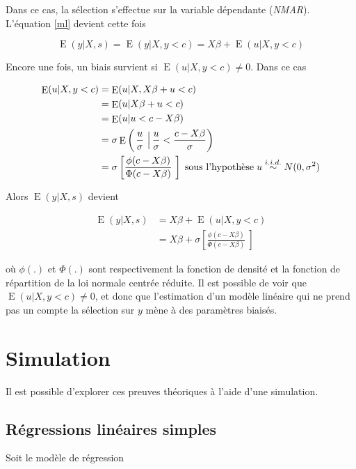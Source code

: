 \documentclass{article}
\DeclareMathOperator{\esp}{E}
\begin{document}
Dans ce cas, la s\'{e}lection s'effectue sur la variable d\'{e}pendante (\textit{NMAR}). L'\'{e}quation \eqref{ml} devient cette fois

\[\esp(y|X,s)=\esp(y|X,y<c)=X\beta+\esp(u|X,y<c)\]

Encore une fois, un biais survient si $\esp(u|X,y<c)\neq0$. Dans ce cas

\begin{align}
\esp(u|X,y<c) & = \esp(u|X,X\beta+u<c) \nonumber \\
 & = \esp(u|X\beta+u<c) \nonumber \\
 & = \esp(u|u<c-X\beta) \nonumber \\
 & = \sigma\esp\left(\left. \frac{u}{\sigma}\  \right\rvert \frac{u}{\sigma}< \frac{c-X\beta}{\sigma} \right)  \nonumber \\
  & = \sigma\left[ \frac{\phi(c-X\beta)}{\Phi(c-X\beta)}\ \right] \hspace{0.1cm}  \text{sous l'hypoth\`{e}se} \hspace{0.1cm} u\overset{i.i.d.}{\sim} N(0,\sigma^2) \nonumber
\end{align}

Alors $\esp(y|X,s)$ devient

\begin{align}
\esp(y|X,s) & =X\beta+\esp(u|X,y<c) \nonumber \\
& = X\beta+\sigma\left[ \frac{\phi(c-X\beta)}{\Phi(c-X\beta)}\ \right] \nonumber
\end{align}

o\`{u} $\phi(.)$ et $\Phi(.)$ sont respectivement la fonction de densit\'{e} et la fonction de r\'{e}partition de la loi normale centr\'{e}e r\'{e}duite. Il est possible de voir que $\esp(u|X,y<c)\neq0$, et donc que l'estimation d'un mod\`{e}le lin\'{e}aire qui ne prend pas un compte la s\'{e}lection sur $y$ m\`{e}ne \`{a} des param\`{e}tres biais\'{e}s.




\section{Simulation}
Il est possible d'explorer ces preuves th\'{e}oriques \`{a} l'aide d'une simulation. 

\subsection{R\'{e}gressions lin\'{e}aires simples}
Soit le mod\`{e}le de r\'{e}gression
\end{document}
